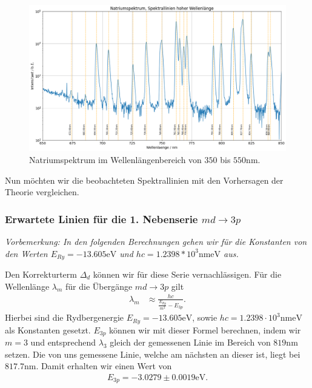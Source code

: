\begin{figure}[H]
  \centering
  \includegraphics[width=.9\textwidth]{files/plots/na_spek_650_850.png}
  \caption{Natriumspektrum im Wellenlängenbereich von $350$ bis $550\si{\nano\meter}$.}
  \label{fig:na_spek_650_850}
\end{figure}

Nun möchten wir die beobachteten Spektrallinien mit den Vorhersagen der Theorie vergleichen.

\subsubsection*{Erwartete Linien für die 1. Nebenserie $md \to 3p$}

\textit{Vorbemerkung: In den folgenden Berechnungen gehen wir für die Konstanten von den Werten $E_{Ry} = -13.605\si{\electronvolt}$ und $hc = 1.2398 * 10^3 \si{\nano\meter \electronvolt}$ aus.}

Den Korrekturterm $\Delta_{d}$ können wir für diese Serie vernachlässigen. Für die Wellenlänge $\lambda_m$ für die Übergänge $md \to 3p$ gilt
\begin{align}
  \lambda_m &\approx \frac{hc}{\frac{E_{Ry}}{m^2} - E_{3p}}.
\end{align}
Hierbei sind die Rydbergenergie $E_{Ry} = -13.605\unit{\electronvolt}$, sowie $hc = 1.2398 \cdot 10^{3} \si{\nano\meter \electronvolt}$ als Konstanten gesetzt. $E_{3p}$ können wir mit dieser Formel berechnen, indem wir $m = 3$ und entsprechend $\lambda_3$ gleich der gemessenen Linie im Bereich von $819\si{\nano\meter}$ setzen. Die von uns gemessene Linie, welche am nächsten an dieser ist, liegt bei $817.7\si{\nano\meter}$. Damit erhalten wir einen Wert von
\begin{align}
  E_{3p} = -3.0279 \pm 0.0019\si{\electronvolt}.
\end{align}

